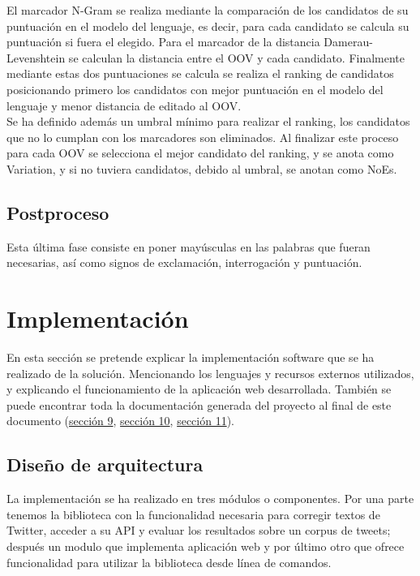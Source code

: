 \documentclass[spanish,12pt, a4paper,twoside]{paper}
\let\oldsection\section
\def\section{\cleardoublepage\oldsection}
\begin{document}
El marcador N-Gram se realiza mediante la comparación de los candidatos de su puntuación en el modelo del lenguaje, es decir, para cada candidato se calcula su puntuación si fuera el elegido. Para el marcador de la distancia Damerau-Levenshtein se calculan la distancia entre el OOV y cada candidato. Finalmente mediante estas dos puntuaciones se calcula se realiza el ranking de candidatos posicionando primero los candidatos con mejor puntuación en el modelo del lenguaje y menor distancia de editado al OOV.\\

Se ha definido además un umbral mínimo para realizar el ranking, los candidatos que no lo cumplan con los marcadores son eliminados. Al finalizar este proceso para cada OOV se selecciona el mejor candidato del ranking, y se anota como Variation, y si no tuviera candidatos, debido al umbral, se anotan como NoEs.

\subsection{Postproceso}\label{sec:postproceso}
Esta última fase consiste en poner mayúsculas en las palabras que fueran necesarias, así como signos de exclamación, interrogación y puntuación.

\section{Implementación}\label{sec:implementacion}
En esta sección se pretende explicar la implementación software que se ha realizado de la solución. Mencionando los lenguajes y recursos externos utilizados, y explicando el funcionamiento de la aplicación web desarrollada. También se puede encontrar toda la documentación generada del proyecto al final de este documento (\hyperref[sec:tweetsccorejavadoc]{sección 9}, \hyperref[sec:tweetscwebjavadoc]{sección 10}, \hyperref[sec:tweetscexecutablejavadoc]{sección 11}).

\subsection{Diseño de arquitectura}\label{sec:disenodearquitectura}
La implementación se ha realizado en tres módulos o componentes. Por una parte tenemos la biblioteca con la funcionalidad necesaria para corregir textos de Twitter, acceder a su API y evaluar los resultados sobre un corpus de tweets; después un modulo que implementa aplicación web y por último otro que ofrece funcionalidad para utilizar la biblioteca desde línea de comandos.\\
\end{document}
